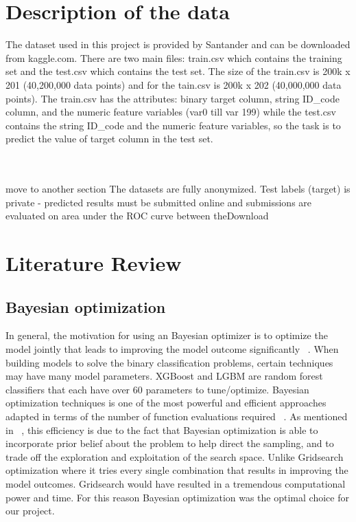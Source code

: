 \documentclass[journal,twoside,web]{ieeecolor}
\begin{document}

\section{Description of the data}
The dataset used in this project is provided by Santander and can be downloaded from kaggle.com. There are two main files: train.csv which contains the training set and the test.csv which contains the test set. The size of the train.csv is 200k x 201 (40,200,000 data points) and for the tain.csv is 200k x 202 (40,000,000 data points). The train.csv has the attributes: binary target column, string ID\_code column, and the numeric feature variables (var0 till var 199) while the test.csv contains the string ID\_code and the numeric feature variables, so the task is to predict the value of target column in the test set. 

\\
\\
move to another section
The datasets are fully anonymized. Test labels (target) is private - predicted results must be submitted online and submissions are evaluated on area under the ROC curve between theDownload






\section{Literature Review}

\subsection{Bayesian optimization}
In general, the motivation for using an Bayesian optimizer is to optimize the model jointly that leads to improving the model outcome significantly ~\cite{shahriari2016taking}. When building models to solve the binary classification problems, certain techniques may have many model parameters. XGBoost and LGBM are random forest classifiers that each have over 60 parameters to tune/optimize. Bayesian optimization techniques is one of the most powerful and efficient approaches adapted in terms of the number of function evaluations required ~\cite{brochu2010tutorial}. As mentioned in  ~\cite{brochu2010tutorial}, this efficiency is due to the fact that Bayesian optimization is able to incorporate prior belief about the problem to help direct the sampling, and to trade off the exploration and exploitation of the search space. Unlike Gridsearch optimization where it tries every single combination that results in improving the model outcomes. Gridsearch would have resulted in a tremendous computational power and time. For this reason Bayesian optimization was the optimal choice for our project. 
\end{document}
